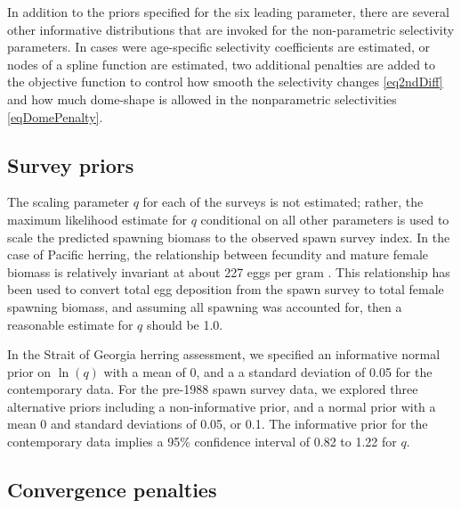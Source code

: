 In addition to the priors specified for the six leading parameter, there are several other informative distributions that are invoked for the non-parametric selectivity parameters.  In cases were age-specific selectivity coefficients are estimated, or nodes of a spline function are estimated, two additional penalties are added to the objective function to control how smooth the selectivity changes \eqref{eq2ndDiff} and how much dome-shape is allowed in the nonparametric selectivities \eqref{eqDomePenalty}.  

\subsection{Survey priors}

The scaling parameter $q$ for each of the surveys is not estimated; rather, the maximum likelihood estimate for $q$ conditional on all other parameters is used to scale the predicted spawning biomass to the observed spawn survey index.  In the case of Pacific herring, the relationship between fecundity and mature female biomass is relatively invariant at about 227 eggs per gram \citep{hardwick1973biomass}.  This relationship has been used to convert total egg deposition from the spawn survey to total female spawning biomass, and assuming all spawning was accounted for, then a reasonable estimate for $q$ should be 1.0.

In the Strait of Georgia herring assessment, we specified an informative normal prior on $\ln(q)$ with a mean of 0, and a a standard deviation of 0.05 for the contemporary data.  For the pre-1988 spawn survey data, we explored three alternative priors including a non-informative prior, and a normal prior with a mean 0 and standard deviations of 0.05, or 0.1.  The informative prior for the contemporary data implies a 95\% confidence interval of 0.82 to 1.22 for $q$.

\subsection{Convergence penalties}

